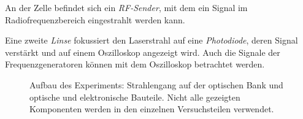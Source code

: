 An der Zelle befindet sich ein \emph{RF-Sender}, mit dem ein Signal im Radiofrequenzbereich eingestrahlt werden kann.

Eine zweite \emph{Linse} fokussiert den Laserstrahl auf eine \emph{Photodiode}, deren Signal verstärkt und auf
einem Oszilloskop angezeigt wird.
Auch die Signale der Frequenzgeneratoren können mit dem Oszilloskop betrachtet werden.


\begin{landscape}

\begin{figure}[H]
        \def\svgwidth{1.4\textwidth}
        
        \caption{Aufbau des Experiments: Strahlengang auf der optischen Bank
        und optische und elektronische Bauteile.
        Nicht alle gezeigten Komponenten werden in den einzelnen
        Versuchsteilen verwendet.}
        \label{img:aufbau}
\end{figure}

\end{landscape}
